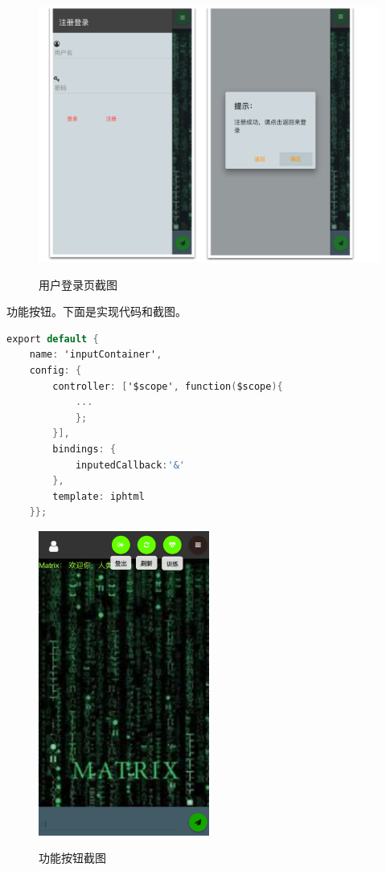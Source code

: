 \documentclass[bachelor,winfonts]{jnuthesis}
\begin{document}
\begin{figure}[H]
  \centering
  \includegraphics[width= 1.0\textwidth]{login.png}\\
  \caption{用户登录页截图}\label{fig:pic8}
\end{figure}


功能按钮。下面是实现代码和截图。

\begin{lstlisting}[language=C]
export default {
	name: 'inputContainer', 
	config: {
		controller: ['$scope', function($scope){
			...
			};
		}],
		bindings: {
			inputedCallback:'&'
		},
		template: iphtml
	}};
\end{lstlisting}

\begin{figure}[H]
  \centering
  \includegraphics[width= 0.5\textwidth]{chat3.png}\\
  \caption{功能按钮截图}\label{fig:pic9}
\end{figure}
\end{document}
